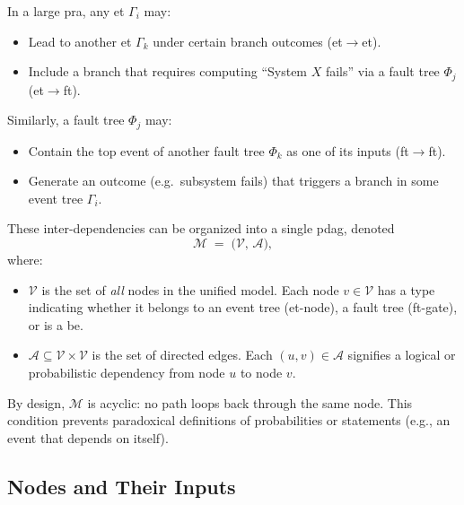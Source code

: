 In a large \acrshort{pra}, any \acrshort{et} \(\Gamma_i\) may:
\begin{itemize}
\item Lead to another \acrshort{et} \(\Gamma_{k}\) under certain branch outcomes (\acrshort{et}\(\to\)\acrshort{et}).  
\item Include a branch that requires computing ``System \(X\) fails'' via a fault tree \(\Phi_j\) (\acrshort{et}\(\to\)\acrshort{ft}).  
\end{itemize}
Similarly, a fault tree \(\Phi_{j}\) may:
\begin{itemize}
\item Contain the top event of another fault tree \(\Phi_{k}\) as one of its inputs (\acrshort{ft}\(\to\)\acrshort{ft}).  
\item Generate an outcome (e.g.\ subsystem fails) that triggers a branch in some event tree \(\Gamma_i\).  
\end{itemize}
These inter-dependencies can be organized into a single \acrshort{pdag}, denoted
\[
\mathcal{M} \;=\; \bigl(\mathcal{V},\,\mathcal{A}\bigr),
\]
where:
\begin{itemize}
\item \(\mathcal{V}\) is the set of \emph{all} nodes in the unified model.  Each node \(v\in \mathcal{V}\) has a type indicating whether it belongs to an event tree (\acrshort{et}-node), a fault tree (\acrshort{ft}-gate), or is a \acrfull{be}.  
\item \(\mathcal{A}\subseteq \mathcal{V}\times \mathcal{V}\) is the set of directed edges.  Each \((u,v)\in \mathcal{A}\) signifies a logical or probabilistic dependency from node \(u\) to node \(v\).  
\end{itemize}
By design, \(\mathcal{M}\) is acyclic: no path loops back through the same node.  This condition prevents paradoxical definitions of probabilities or statements (e.g., an event that depends on itself).

\subsection{Nodes and Their Inputs}

